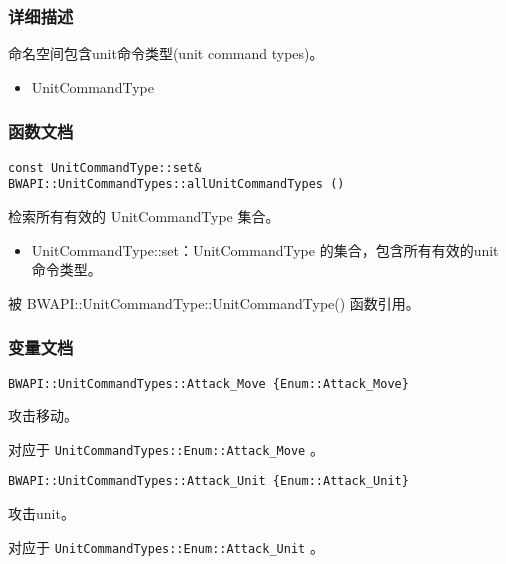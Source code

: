 \subsubsection{详细描述}
命名空间包含unit命令类型(unit command types)。
\begin{refer}
\begin{itemize}
    \item UnitCommandType
\end{itemize}
\end{refer}
\subsubsection{函数文档}
\begin{tcolorbox}[colback=white, colframe=black!60!white, title=allUnitCommandTypes(), arc=0mm]
\begin{verbatim}
const UnitCommandType::set& BWAPI::UnitCommandTypes::allUnitCommandTypes ()
\end{verbatim}
检索所有有效的   UnitCommandType   集合。
\begin{return}
\begin{itemize}
    \item UnitCommandType::set：UnitCommandType 的集合，包含所有有效的unit命令类型。
\end{itemize}
\end{return}
被 BWAPI::UnitCommandType::UnitCommandType()   函数引用。
\end{tcolorbox}
\subsubsection{变量文档}


\begin{tcolorbox}[colback=white, colframe=black!60!white, title=Attack\_Move\{\}, arc=0mm]
\begin{verbatim}
BWAPI::UnitCommandTypes::Attack_Move {Enum::Attack_Move}
\end{verbatim}
攻击移动。\par 对应于   \verb|UnitCommandTypes::Enum::Attack_Move|  。
\end{tcolorbox}


\begin{tcolorbox}[colback=white, colframe=black!60!white, title=Attack\_Unit\{\}, arc=0mm]
\begin{verbatim}
BWAPI::UnitCommandTypes::Attack_Unit {Enum::Attack_Unit}
\end{verbatim}
攻击unit。\par 对应于   \verb|UnitCommandTypes::Enum::Attack_Unit|  。
\end{tcolorbox}


